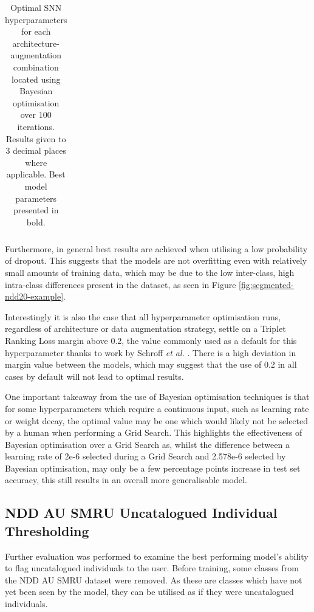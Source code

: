 \begin{table}[!t]
{\begin{tabular}{ccccccccccccc}
			\bottomrule                                                      
	\end{tabular}}
	\caption{Optimal SNN hyperparameters for each architecture-augmentation combination located using Bayesian optimisation over 100 iterations. Results given to 3 decimal places where applicable. Best model parameters presented in bold.}
	\label{tab:optunaBestParamsPerSNN}
\end{table}

 Furthermore, in general best results are achieved when utilising a low probability of dropout. This suggests that the models are not overfitting even with relatively small amounts of training data, which may be due to the low inter-class, high intra-class differences present in the dataset, as seen in Figure \ref{fig:segmented-ndd20-example}.
 
 Interestingly it is also the case that all hyperparameter optimisation runs, regardless of architecture or data augmentation strategy, settle on a Triplet Ranking Loss margin above 0.2, the value commonly used as a default for this hyperparameter thanks to work by Schroff \textit{et al.} \cite{schroff_facenet_2015}. There is a high deviation in margin value between the models, which may suggest that the use of 0.2 in all cases by default will not lead to optimal results.
 
 One important takeaway from the use of Bayesian optimisation techniques is that for some hyperparameters which require a continuous input, such as learning rate or weight decay, the optimal value may be one which would likely not be selected by a human when performing a Grid Search. This highlights the effectiveness of Bayesian optimisation over a Grid Search as, whilst the difference between a learning rate of 2e-6 selected during a Grid Search and 2.578e-6 selected by Bayesian optimisation, may only be a few percentage points increase in test set accuracy, this still results in an overall more generalisable model. 
 
\subsection{ NDD AU SMRU Uncatalogued Individual Thresholding}\label{ch:ID,sec:ModelSelection,subsec:UncataloguedIndividualThresholding}

Further evaluation was performed to examine the best performing model's ability to flag uncatalogued individuals to the user. Before training, some classes from the NDD AU SMRU dataset were removed. As these are classes which have not yet been seen by the model, they can be utilised as if they were uncatalogued individuals.

